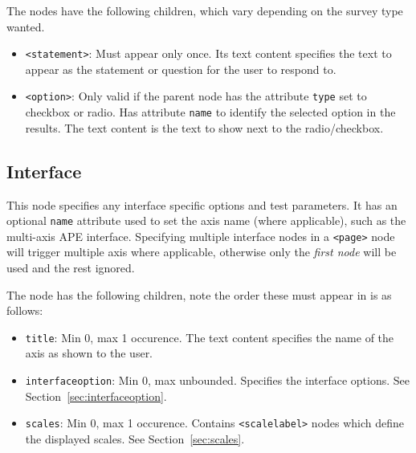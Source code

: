\documentclass[11pt, oneside]{article}   	%
\begin{document}
        The nodes have the following children, which vary depending on the survey type wanted.
        \begin{itemize}
            \item \texttt{<statement>}: Must appear only once. Its text content specifies the text to appear as the statement or question for the user to respond to.
            \item \texttt{<option>}: Only valid if the parent node has the attribute \texttt{type} set to checkbox or radio. Has attribute \texttt{name} to identify the selected option in the results. The text content is the text to show next to the radio/checkbox.
        \end{itemize}

    \subsection{Interface}
        This node specifies any interface specific options and test parameters. It has an optional \texttt{name} attribute used to set the axis name (where applicable), such as the multi-axis APE interface. Specifying multiple interface nodes in a \texttt{<page>} node will trigger multiple axis where applicable, otherwise only the \emph{first node} will be used and the rest ignored.
        
        The node has the following children, note the order these must appear in is as follows:
        \begin{itemize}
            \item \texttt{title}: Min 0, max 1 occurence. The text content specifies the name of the axis as shown to the user.
            \item \texttt{interfaceoption}: Min 0, max unbounded. Specifies the interface options. See Section~\ref{sec:interfaceoption}.
            \item \texttt{scales}: Min 0, max 1 occurence. Contains \texttt{<scalelabel>} nodes which define the displayed scales. See Section~\ref{sec:scales}.
        \end{itemize}
\end{document}
